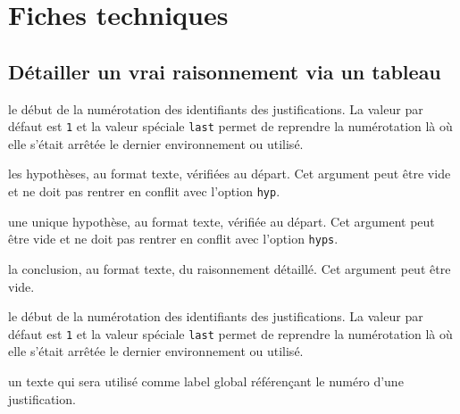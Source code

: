 \documentclass[12pt,a4paper]{article}
\begin{document}

\section{Fiches techniques}

\subsection{Détailler un \og vrai \fg{} raisonnement via un tableau}


 le début de la numérotation des identifiants des justifications.
              La valeur par défaut est \verb+1+ et la valeur spéciale \verb+last+ permet de reprendre la numérotation là où elle s'était arrêtée le dernier environnement  ou  utilisé.

 les hypothèses, au format texte, vérifiées au départ.
              Cet argument peut être vide et ne doit pas rentrer en conflit avec l'option \verb+hyp+.

 une unique hypothèse, au format texte, vérifiée au départ.
              Cet argument peut être vide et ne doit pas rentrer en conflit avec l'option \verb+hyps+.

 la conclusion, au format texte, du raisonnement détaillé.
              Cet argument peut être vide.


\separation



 le début de la numérotation des identifiants des justifications.
              La valeur par défaut est \verb+1+ et la valeur spéciale \verb+last+ permet de reprendre la numérotation là où elle s'était arrêtée le dernier environnement  ou  utilisé.


\separation



\IDoption{} un texte qui sera utilisé comme label global référençant le numéro d'une justification.


\separation


  \hfill {}
\end{document}
